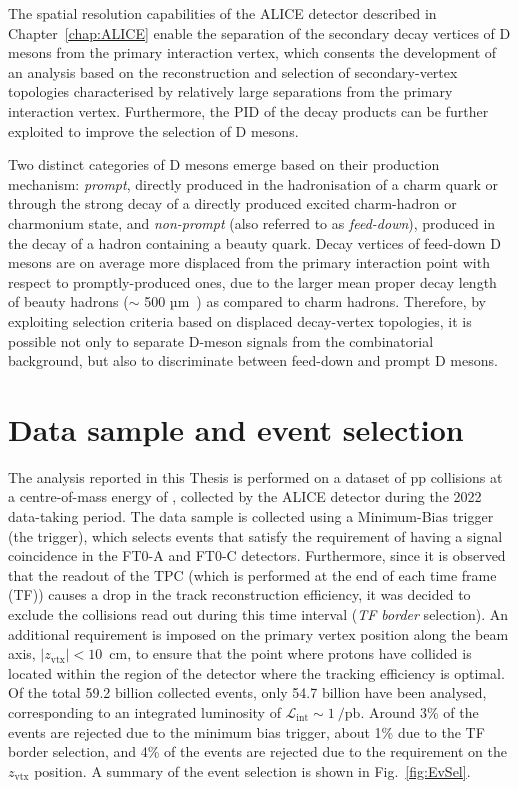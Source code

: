The spatial resolution capabilities of the ALICE detector described in Chapter~\ref{chap:ALICE} enable the separation of the secondary decay vertices of D mesons from the primary interaction vertex, which consents the development of an analysis based on the reconstruction and selection of secondary-vertex topologies characterised by relatively large separations from the primary interaction vertex. Furthermore, the PID of the decay products can be further exploited to improve the selection of D mesons.

Two distinct categories of D mesons emerge based on their production mechanism: \emph{prompt}, directly produced in the hadronisation of a charm quark or through the strong decay of a directly produced excited charm-hadron or charmonium state, and \emph{non-prompt} (also referred to as \emph{feed-down}), produced in the decay of a hadron containing a beauty quark. Decay vertices of feed-down D mesons are on average more displaced from the primary interaction point with respect to promptly-produced ones, due to the larger mean proper decay length of beauty hadrons (\ct $\sim$ 500 µm~\cite{pdg}) as compared to charm hadrons. Therefore, by exploiting selection criteria based on displaced decay-vertex topologies, it is possible not only to separate D-meson signals from the combinatorial background, but also to discriminate between feed-down and prompt D mesons.

\section{Data sample and event selection}
The analysis reported in this Thesis is performed on a dataset of pp collisions at a centre-of-mass energy of \thirteen, collected by the ALICE detector during the 2022 data-taking period. The data sample is collected using a Minimum-Bias trigger (the  trigger), which selects events that satisfy the requirement of having a signal coincidence in the FT0-A and FT0-C detectors. Furthermore, since it is observed that the readout of the TPC (which is performed at the end of each time frame (TF)) causes a drop in the track reconstruction efficiency, it was decided to exclude the collisions read out during this time interval (\emph{TF border} selection). An additional requirement is imposed on the primary vertex position along the beam axis, $\lvert z_{\mathrm{vtx}}\rvert<10$~cm, to ensure that the point where protons have collided is located within the region of the detector where the tracking efficiency is optimal. Of the total 59.2 billion collected events, only 54.7 billion have been analysed, corresponding to an integrated luminosity of $\mathcal{L}_\mathrm{int}\sim \SI{1}{\per\pico\barn}$. Around 3\% of the events are rejected due to the minimum bias trigger, about 1\% due to the TF border selection, and 4\% of the events are rejected due to the requirement on the $z_{\mathrm{vtx}}$ position. A summary of the event selection is shown in Fig.~\ref{fig:EvSel}.


